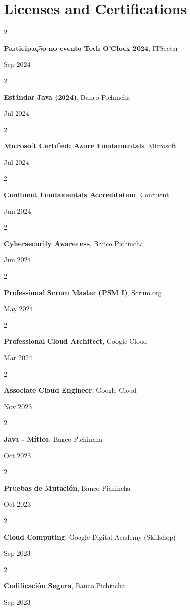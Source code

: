 \documentclass[10pt, letterpaper]{article}
\newenvironment{twocolentry}[2][]{
    \onecolentry
    \def\secondColumn{#2}
    \setcolumnwidth{\fill, 4.5 cm}
    \begin{paracol}{2}
}{
    \switchcolumn \raggedleft \secondColumn
    \end{paracol}
    \endonecolentry
} %
\begin{document}
    \section{Licenses and Certifications}
    \begin{twocolentry}{
        Sep 2024
    }
    \textbf{Participação no evento Tech O'Clock 2024}, ITSector
    \end{twocolentry}
    \begin{twocolentry}{
            Jul 2024
        }
        \textbf{Estándar Java (2024)}, Banco Pichincha
    \end{twocolentry}
    \begin{twocolentry}{
        Jul 2024
    }
    \textbf{Microsoft Certified: Azure Fundamentals}, Microsoft
    \end{twocolentry}
    \begin{twocolentry}{
            Jun 2024
        }
        \textbf{Confluent Fundamentals Accreditation}, Confluent
    \end{twocolentry}
    \begin{twocolentry}{
            Jun 2024
        }
        \textbf{Cybersecurity Awareness}, Banco Pichincha
    \end{twocolentry}
    \begin{twocolentry}{
            May 2024
        }
        \textbf{Professional Scrum Master (PSM I)}, Scrum.org
    \end{twocolentry}
    \begin{twocolentry}{
            Mar 2024
        }
        \textbf{Professional Cloud Architect}, Google Cloud
    \end{twocolentry}
    \begin{twocolentry}{
            Nov 2023
        }
        \textbf{Associate Cloud Engineer}, Google Cloud
    \end{twocolentry}
    \begin{twocolentry}{
            Oct 2023
        }
        \textbf{Java - Mítico}, Banco Pichincha
    \end{twocolentry}
    \begin{twocolentry}{
            Oct 2023
        }
        \textbf{Pruebas de Mutación}, Banco Pichincha
    \end{twocolentry}
    \begin{twocolentry}{
            Sep 2023
        }
        \textbf{Cloud Computing}, Google Digital Academy (Skillshop)
    \end{twocolentry}
    \begin{twocolentry}{
            Sep 2023
        }
        \textbf{Codificación Segura}, Banco Pichincha
    \end{twocolentry}
\end{document}
